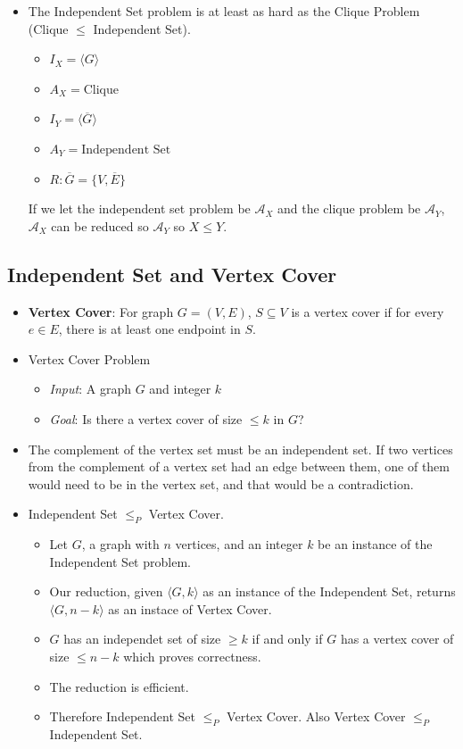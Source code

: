 \documentclass[12pt]{article}
\begin{document}
\begin{itemize}
    \item The Independent Set problem is at least as hard as the Clique Problem (Clique $\leq$ Independent Set).
    \begin{itemize}
        \item $I_X = \langle G \rangle$
        \item $A_X = \text{Clique}$
        \item $I_Y = \langle \overline{G} \rangle$
        \item $A_Y = \text{Independent Set}$
        \item $R: \overline{G} = \{ V, \overline{E} \}$
    \end{itemize}
    If we let the independent set problem be $\mathcal{A}_X$ and the clique problem be $\mathcal{A}_Y$, $\mathcal{A}_X$ can be reduced so $\mathcal{A}_Y$ so $X \leq Y$.
\end{itemize}

\subsection{Independent Set and Vertex Cover}
\begin{itemize}
    \item \textbf{Vertex Cover}: For graph $G = (V, E)$, $S \subseteq V$ is a vertex cover if for every $e \in E$, there is at least one endpoint in $S$.
    \item Vertex Cover Problem
    \begin{itemize}
        \item \textit{Input}: A graph $G$ and integer $k$
        \item \textit{Goal}: Is there a vertex cover of size $\leq k$ in $G$?
    \end{itemize}
    \item The complement of the vertex set must be an independent set. If two vertices from the complement of a vertex set had an edge between them, one of them would need to be in the vertex set, and that would be a contradiction.
    \item Independent Set $\leq_P$ Vertex Cover.
    \begin{itemize}
        \item Let $G$, a graph with $n$ vertices, and an integer $k$ be an instance of the Independent Set problem.
        \item Our reduction, given $\langle G, k \rangle$ as an instance of the Independent Set, returns $\langle G, n - k \rangle$ as an instace of Vertex Cover. 
        \item $G$ has an independet set of size $\geq k$ if and only if $G$ has a vertex cover of size $\leq n - k$ which proves correctness.
        \item The reduction is efficient.
        \item Therefore Independent Set $\leq_P$ Vertex Cover. Also Vertex Cover $\leq_P$ Independent Set.
    \end{itemize}
\end{itemize}
\end{document}
